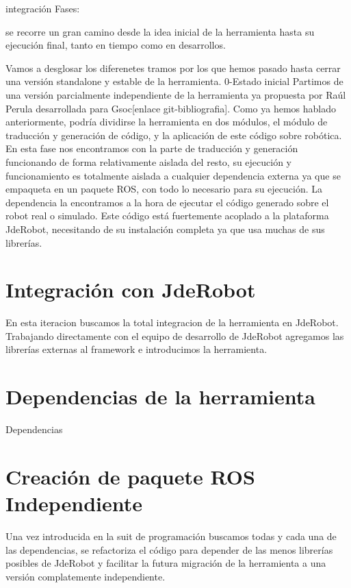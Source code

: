 integración
Fases:

se recorre un gran camino desde la idea inicial de la herramienta hasta su ejecución final, tanto en tiempo como en desarrollos. 

Vamos a desglosar los diferenetes tramos por los que hemos pasado hasta cerrar una versión standalone y estable de la herramienta.
0-Estado inicial
Partimos de una versión parcialmente independiente de la herramienta ya propuesta por Raúl Perula desarrollada para Gsoc[enlace git-bibliografia].
Como ya hemos hablado anteriormente, podría dividirse la herramienta en dos módulos, el módulo de traducción y generación de código, y la aplicación de este
código sobre robótica.
En esta fase nos encontramos con la parte de traducción y generación funcionando de forma relativamente aislada del resto, 
su ejecución y funcionamiento es totalmente aislada a cualquier dependencia externa ya que se empaqueta en un paquete ROS, con todo lo 
necesario para su ejecución. La dependencia la encontramos a la hora de ejecutar el código generado sobre el robot real o simulado.
Este código está fuertemente acoplado a la plataforma JdeRobot, necesitando de su instalación completa ya que usa muchas de sus librerías.


\section{Integración con JdeRobot}
\label{sec:integracion-con-jderobot}
En esta iteracion buscamos la total integracion de la herramienta en JdeRobot. Trabajando directamente con el equipo de desarrollo de JdeRobot 
agregamos las librerías externas al framework e introducimos la herramienta.

\section{Dependencias de la herramienta}
\label{sec:dependencias}

Dependencias

\section{Creación de paquete ROS Independiente}
\label{sec:paquete-ros}

Una vez introducida en la suit de programación buscamos todas y cada una de las dependencias, se refactoriza el código para depender de las menos librerías posibles 
de JdeRobot y facilitar la futura migración de la herramienta a una versión complatemente independiente.

